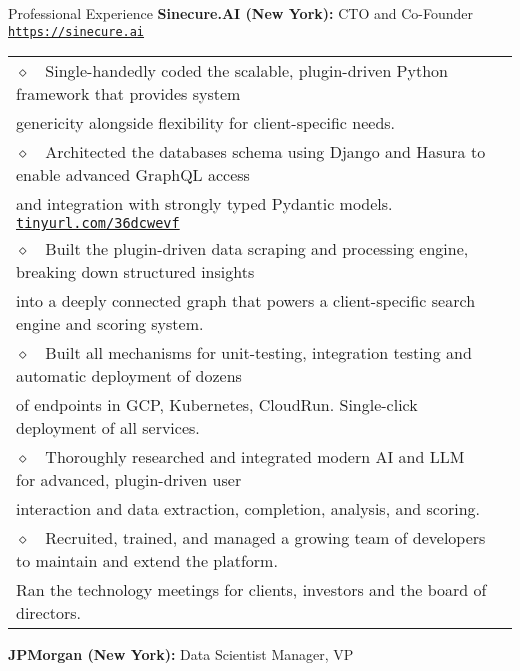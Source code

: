 \begin{rubric}{Professional Experience}
\entry*[2021-2024]%
\textbf{Sinecure.AI (New York):} CTO and Co-Founder \href{https://sinecure.ai}{\texttt{https://sinecure.ai}}
\par
  {\renewcommand{\arraystretch}{1}%
    \begin{tabular}{>{}l<{}@{\hspace{5pt}}%
    p{}}
      $\diamond$~~Single-handedly coded the scalable, plugin-driven Python framework that provides system \\
      genericity alongside flexibility for client-specific needs. \\
      $\diamond$~~Architected the databases schema using Django and Hasura to enable advanced GraphQL access \\
      and integration with strongly typed Pydantic models. \href{http://tinyurl.com/36dcwevf}{\texttt{tinyurl.com/36dcwevf}} \\
      $\diamond$~~Built the plugin-driven data scraping and processing engine, breaking down structured insights \\
      into a deeply connected graph that powers a client-specific search engine and scoring system. \\
      $\diamond$~~Built all mechanisms for unit-testing, integration testing and automatic deployment of dozens \\
      of endpoints in GCP, Kubernetes, CloudRun. Single-click deployment of all services. \\
      $\diamond$~~Thoroughly researched and integrated modern AI and LLM for advanced, plugin-driven user \\ 
      interaction and data extraction, completion, analysis, and scoring. \\
      $\diamond$~~Recruited, trained, and managed a growing team of developers to maintain and extend the platform. \\
      Ran the technology meetings for clients, investors and the board of directors.
    \end{tabular}%
   }
%
\entry*[2018-2021]%
\textbf{JPMorgan (New York):} Data Scientist Manager, VP
\par
  {\renewcommand{\arraystretch}{1}%
    \begin{tabular}{>{}l<{}@{\hspace{5pt}}%
    p{}}

\end{tabular}}
\end{rubric}
